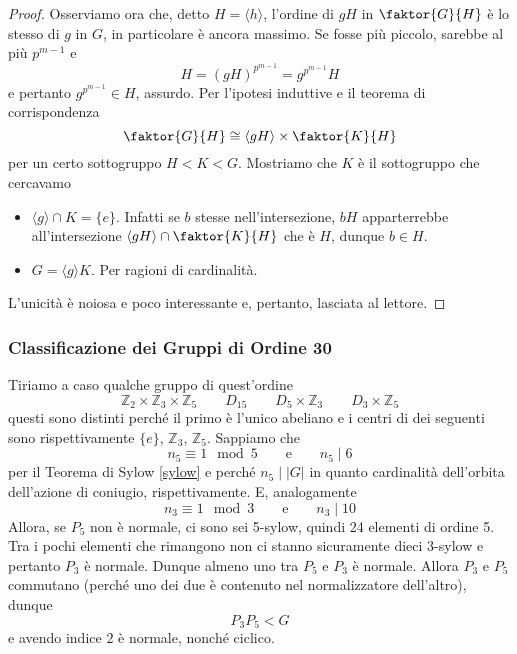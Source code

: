 \begin{multicols}{2}
\begin{proof}
	Osserviamo ora che, detto $ H = \langle h \rangle $, l'ordine di $ gH $ in $ \faktor{G}{H} $ è lo stesso di $ g $ in $ G $, in particolare è ancora massimo. Se fosse più piccolo, sarebbe al più $ p^{m-1} $ e
	\[ H = (gH)^{p^{m-1}} = g^{p^{m-1}}H \]
	e pertanto $ g^{p^{m-1}} \in H $, assurdo.
	 Per l'ipotesi induttive e il teorema di corrispondenza
	\[ \faktor{G}{H} \cong \langle gH \rangle \times \faktor{K}{H} \]
	per un certo sottogruppo $ H < K < G $. Mostriamo che $ K $ è il sottogruppo che cercavamo
	\begin{itemize}
		\item $ \langle g \rangle \cap K = \{e\} $. Infatti se $ b $ stesse nell'intersezione, $ bH $ apparterrebbe all'intersezione $ \langle gH \rangle \cap \faktor{K}{H} $ che è $ H $, dunque $ b \in H $.
		\item $ G = \langle g \rangle K $. Per ragioni di cardinalità. 
	\end{itemize}


L'unicità è noiosa e poco interessante e, pertanto, lasciata al lettore. 

\end{proof}
	\columnbreak
\subsubsection{Classificazione dei Gruppi di Ordine 30}
Tiriamo a caso qualche gruppo di quest'ordine
\[ \boxed{\mathbb{Z}_2\times\mathbb{Z}_3\times\mathbb{Z}_5} \qquad \boxed{D_{15}} \qquad \boxed{D_5\times\mathbb{Z}_3} \qquad \boxed{D_{3}\times\mathbb{Z}_5} \]
questi sono distinti perché il primo è l'unico abeliano e i centri di dei seguenti sono rispettivamente $ \{e\},\, \mathbb{Z}_3,\, \mathbb{Z}_5 $. Sappiamo che
\[ n_5 \equiv 1 \mod{5} \qquad\text{e}\qquad n_5 \mid 6 \]
per il Teorema di Sylow \ref{sylow} e perché $ n_5 \mid |G| $ in quanto cardinalità dell'orbita dell'azione di coniugio, rispettivamente. E, analogamente
\[ n_3 \equiv 1 \mod{3} \qquad\text{e}\qquad n_3 \mid 10 \]
Allora, se $ P_5 $ non è normale, ci sono sei 5-sylow, quindi 24 elementi di ordine 5. Tra i pochi elementi che rimangono non ci stanno sicuramente dieci 3-sylow e pertanto $ P_3 $ è normale. Dunque almeno uno tra $ P_5 $ e $ P_3 $ è normale. Allora $ P_3 $ e $ P_5 $ commutano (perché uno dei due è contenuto nel normalizzatore dell'altro), dunque
\[ P_3P_5 < G \]
e avendo indice $ 2 $ è normale, nonché ciclico.


\end{multicols}
